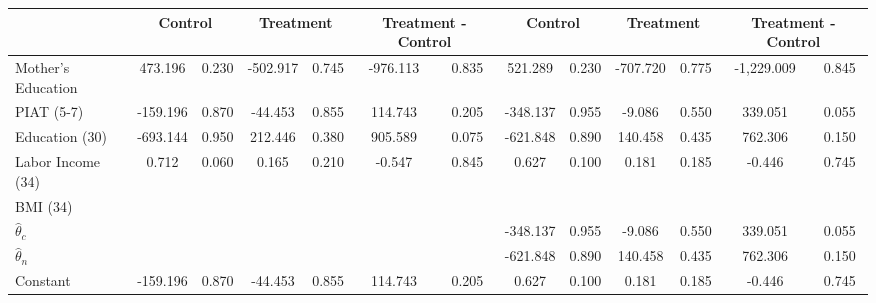 \begin{tabular}{lcccccccccccc} \toprule
&\multicolumn{2}{c}{Control} & \multicolumn{2}{c}{Treatment} & \multicolumn{2}{c}{Treatment - Control} & \multicolumn{2}{c}{Control} & \multicolumn{2}{c}{Treatment} & \multicolumn{2}{c}{Treatment - Control} \\ \midrule
Mother's Education &   473.196 &     0.230 &  -502.917 &     0.745 &  -976.113 &     0.835 &   521.289 &     0.230 &  -707.720 &     0.775 & -1,229.009 &     0.845 \\  
PIAT (5-7) &  -159.196 &     0.870 &   -44.453 &     0.855 &   114.743 &     0.205 &  -348.137 &     0.955 &    -9.086 &     0.550 &   339.051 &     0.055 \\  
Education (30) &  -693.144 &     0.950 &   212.446 &     0.380 &   905.589 &     0.075 &  -621.848 &     0.890 &   140.458 &     0.435 &   762.306 &     0.150 \\  
Labor Income (34) &     0.712 &     0.060 &     0.165 &     0.210 &    -0.547 &     0.845 &     0.627 &     0.100 &     0.181 &     0.185 &    -0.446 &     0.745 \\  
BMI (34)  &         &         &         &         &         &         &         &         &         &         &         &          \\  
$\hat{\theta}_{c}$ &         &         &         &         &         &         &  -348.137 &     0.955 &    -9.086 &     0.550 &   339.051 &     0.055 \\  
$\hat{\theta}_{n}$ &         &         &         &         &         &         &  -621.848 &     0.890 &   140.458 &     0.435 &   762.306 &     0.150 \\  
Constant &  -159.196 &     0.870 &   -44.453 &     0.855 &   114.743 &     0.205 &     0.627 &     0.100 &     0.181 &     0.185 &    -0.446 &     0.745 \\  
\bottomrule  \end{tabular}
